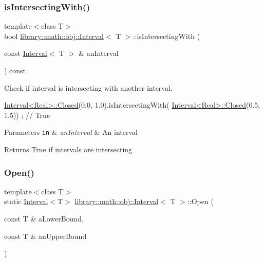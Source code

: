 \subsubsection{\texorpdfstring{is\+Intersecting\+With()}{isIntersectingWith()}}
{\footnotesize\ttfamily template$<$class T$>$ \\
bool \hyperlink{classlibrary_1_1math_1_1obj_1_1_interval}{library\+::math\+::obj\+::\+Interval}$<$ T $>$\+::is\+Intersecting\+With (\begin{DoxyParamCaption}\item[{const \hyperlink{classlibrary_1_1math_1_1obj_1_1_interval}{Interval}$<$ T $>$ \&}]{an\+Interval }\end{DoxyParamCaption}) const}



Check if interval is intersecting with another interval. 


\begin{DoxyCode}
\hyperlink{classlibrary_1_1math_1_1obj_1_1_interval_aae8bb2b89af450729338d48563def4d7}{Interval<Real>::Closed}(0.0, 1.0).isIntersectingWith(
      \hyperlink{classlibrary_1_1math_1_1obj_1_1_interval_aae8bb2b89af450729338d48563def4d7}{Interval<Real>::Closed}(0.5, 1.5)) ; \textcolor{comment}{// True}
\end{DoxyCode}



\begin{DoxyParams}[1]{Parameters}
\mbox{\tt in}  & {\em an\+Interval} & An interval \\
\hline
\end{DoxyParams}
\begin{DoxyReturn}{Returns}
True if intervals are intersecting 
\end{DoxyReturn}
\mbox{\label{classlibrary_1_1math_1_1obj_1_1_interval_add0e1114a0c153da7a928fd059a08919}} 
\subsubsection{\texorpdfstring{Open()}{Open()}}
{\footnotesize\ttfamily template$<$class T$>$ \\
static \hyperlink{classlibrary_1_1math_1_1obj_1_1_interval}{Interval}$<$T$>$ \hyperlink{classlibrary_1_1math_1_1obj_1_1_interval}{library\+::math\+::obj\+::\+Interval}$<$ T $>$\+::Open (\begin{DoxyParamCaption}\item[{const T \&}]{a\+Lower\+Bound,  }\item[{const T \&}]{an\+Upper\+Bound }\end{DoxyParamCaption})\hspace{0.3cm}{\ttfamily [static]}}



